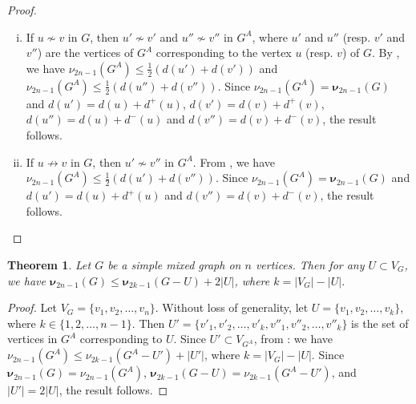\documentclass[12pt]{article}
\numberwithin{equation}{section}
\newtheorem{thm}{Theorem}[section]
\begin{document}
	\begin{proof}
		\begin{enumerate}[(i)]
			\item If $u\not\sim v$ in $G$, then $u'\not\sim v'$ and $u''\not\sim v''$ in $G^A$, where $u'$ and $u''$ (resp. $v'$ and $v''$) are the vertices of $G^A$ corresponding to the vertex $u$ (resp.  $v$) of $G$. By \cite[Theorem~7.4.4]{cvetkovic} 
			, we have $\nu_{2n-1}(G^A)\leq\frac{1}{2}(d(u')+d(v'))$ and $\nu_{2n-1}(G^A)\leq\frac{1}{2}(d(u'')+d(v''))$. Since $\nu_{2n-1}(G^A)=\bm{\nu}_{2n-1}(G)$ and $d(u')=d(u)+d^+(u)$, $d(v')=d(v)+d^+(v)$, $d(u'')=d(u)+d^-(u)$ and $d(v'')=d(v)+d^-(v)$, the result follows.
			\item If $u\not\rightarrow v$ in $G$, then $u'\not\sim v''$ in $G^A$. From \cite[Theorem~7.4.4]{cvetkovic}, we have $\nu_{2n-1}(G^A)\leq\frac{1}{2}(d(u')+d(v''))$. Since $\nu_{2n-1}(G^A)=\bm{\nu}_{2n-1}(G)$ and $d(u')=d(u)+d^+(u)$ and $d(v'')=d(v)+d^-(v)$, the result follows.
		\end{enumerate}
	\end{proof}
	
	\begin{thm}
		Let $G$ be a simple mixed graph on $n$ vertices. Then for any $U\subset V_G$, we have $\bm{\nu}_{2n-1}(G)\leq\bm{\nu}_{2k-1}(G-U)+2|U|$, where $k=|V_G|-|U|$.
	\end{thm}
	\begin{proof}
		Let $V_G=\{v_1,v_2,\ldots,v_n\}$. Without loss of generality, let $U=\{v_1,v_2,\ldots,v_k\}$, where $k\in\{1,2,\ldots,n-1\}$. Then $U'=\{v'_1,v'_2,\ldots,v'_k,v''_1,v''_2,\ldots,v''_k\}$ is the set of vertices in $G^A$ corresponding to $U$. Since $U'\subset V_{G^A}$, from \cite[Theorem~7.4.5]{cvetkovic}: 
		we have $\nu_{2n-1}(G^A)\leq\nu_{2k-1}(G^A-U')+|U'|$, where $k=|V_G|-|U|$. Since $\bm{\nu}_{2n-1}(G)=\nu_{2n-1}(G^A)$, $\bm{\nu}_{2k-1}(G-U)=\nu_{2k-1}(G^A-U')$, and $|U'|=2|U|$, the result follows.
	\end{proof}
	
\end{document}
